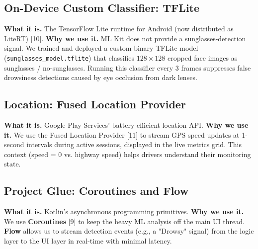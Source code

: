 \documentclass[11pt]{report}
\begin{document}
\subsection{On-Device Custom Classifier: TFLite}
\textbf{What it is.} The TensorFlow Lite runtime for Android (now distributed as LiteRT) [10].
\textbf{Why we use it.} ML Kit does not provide a sunglasses-detection signal. We trained and deployed a custom binary TFLite model (\texttt{sunglasses\_model.tflite}) that classifies $128 \times 128$ cropped face images as sunglasses / no-sunglasses. Running this classifier every 3 frames suppresses false drowsiness detections caused by eye occlusion from dark lenses.

\subsection{Location: Fused Location Provider}
\textbf{What it is.} Google Play Services' battery-efficient location API.
\textbf{Why we use it.} We use the Fused Location Provider [11] to stream GPS speed updates at 1-second intervals during active sessions, displayed in the live metrics grid. This context (speed = 0 vs. highway speed) helps drivers understand their monitoring state.

\subsection{Project Glue: Coroutines and Flow}
\textbf{What it is.} Kotlin’s asynchronous programming primitives.
\textbf{Why we use it.} We use \textbf{Coroutines} [9] to keep the heavy ML analysis off the main UI thread. \textbf{Flow} allows us to stream detection events (e.g., a "Drowsy" signal) from the logic layer to the UI layer in real-time with minimal latency.
\end{document}
